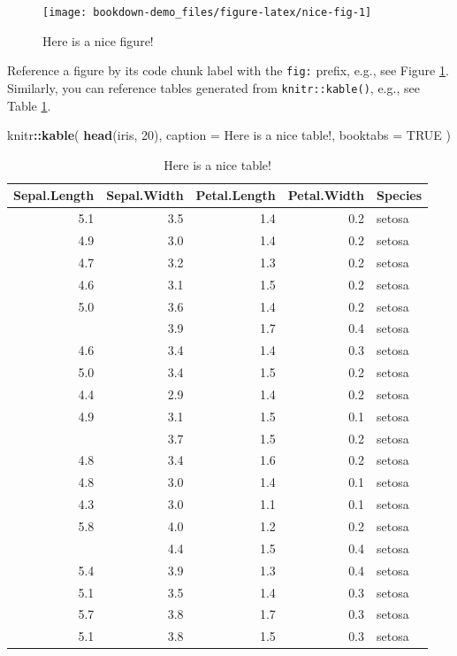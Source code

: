 \documentclass[
]{book}
\newenvironment{Shaded}{\begin{snugshade}}{\end{snugshade}}
\newcommand{\DataTypeTok}[1]{\textcolor[rgb]{0.13,0.29,0.53}{#1}}
\newcommand{\DecValTok}[1]{\textcolor[rgb]{0.00,0.00,0.81}{#1}}
\newcommand{\KeywordTok}[1]{\textcolor[rgb]{0.13,0.29,0.53}{\textbf{#1}}}
\newcommand{\NormalTok}[1]{#1}
\newcommand{\OperatorTok}[1]{\textcolor[rgb]{0.81,0.36,0.00}{\textbf{#1}}}
\newcommand{\OtherTok}[1]{\textcolor[rgb]{0.56,0.35,0.01}{#1}}
\newcommand{\StringTok}[1]{\textcolor[rgb]{0.31,0.60,0.02}{#1}}
\theoremstyle{definition}
\theoremstyle{definition}
\theoremstyle{definition}
\theoremstyle{remark}
\begin{document}
\begin{figure}

{\centering \texttt{[image: bookdown-demo\_files/figure-latex/nice-fig-1]} 

}

\caption{Here is a nice figure!}\label{fig:nice-fig}
\end{figure}

Reference a figure by its code chunk label with the \texttt{fig:} prefix, e.g., see Figure \ref{fig:nice-fig}. Similarly, you can reference tables generated from \texttt{knitr::kable()}, e.g., see Table \ref{tab:nice-tab}.

\begin{Shaded}
\begin{Highlighting}[]
\NormalTok{knitr}\OperatorTok{::}\KeywordTok{kable}\NormalTok{(}
  \KeywordTok{head}\NormalTok{(iris, }\DecValTok{20}\NormalTok{), }\DataTypeTok{caption =} \StringTok{\textquotesingle{}Here is a nice table!\textquotesingle{}}\NormalTok{,}
  \DataTypeTok{booktabs =} \OtherTok{TRUE}
\NormalTok{)}
\end{Highlighting}
\end{Shaded}

\begin{table}

\caption{\label{tab:nice-tab}Here is a nice table!}
\centering
\begin{tabular}[t]{rrrrl}
\toprule
Sepal.Length & Sepal.Width & Petal.Length & Petal.Width & Species\\
\midrule
5.1 & 3.5 & 1.4 & 0.2 & setosa\\
4.9 & 3.0 & 1.4 & 0.2 & setosa\\
4.7 & 3.2 & 1.3 & 0.2 & setosa\\
4.6 & 3.1 & 1.5 & 0.2 & setosa\\
5.0 & 3.6 & 1.4 & 0.2 & setosa\\
\addlinespace
5.4 & 3.9 & 1.7 & 0.4 & setosa\\
4.6 & 3.4 & 1.4 & 0.3 & setosa\\
5.0 & 3.4 & 1.5 & 0.2 & setosa\\
4.4 & 2.9 & 1.4 & 0.2 & setosa\\
4.9 & 3.1 & 1.5 & 0.1 & setosa\\
\addlinespace
5.4 & 3.7 & 1.5 & 0.2 & setosa\\
4.8 & 3.4 & 1.6 & 0.2 & setosa\\
4.8 & 3.0 & 1.4 & 0.1 & setosa\\
4.3 & 3.0 & 1.1 & 0.1 & setosa\\
5.8 & 4.0 & 1.2 & 0.2 & setosa\\
\addlinespace
5.7 & 4.4 & 1.5 & 0.4 & setosa\\
5.4 & 3.9 & 1.3 & 0.4 & setosa\\
5.1 & 3.5 & 1.4 & 0.3 & setosa\\
5.7 & 3.8 & 1.7 & 0.3 & setosa\\
5.1 & 3.8 & 1.5 & 0.3 & setosa\\
\bottomrule
\end{tabular}
\end{table}
\end{document}
